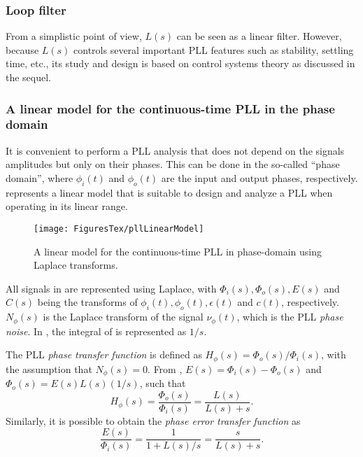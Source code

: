 \subsubsection{Loop filter}

From a simplistic point of view, $L(s)$ can be seen as a linear filter.
However, because $L(s)$ controls
several important PLL features such as stability, settling time, etc., its study and design is based on control systems theory as discussed in the sequel. 

\subsubsection{A linear model for the continuous-time PLL in the phase domain}

It is convenient to perform a PLL analysis that does not depend on the signals amplitudes but only on their phases. This can be done in the so-called ``phase domain'', where $\phi_i(t)$ and $\phi_o(t)$ are
the input and output phases, respectively.
 represents a linear model that is suitable
to design and analyze a PLL when operating in its linear range. 

\begin{figure}[htbp]
\centering
\texttt{[image: FiguresTex/pllLinearModel]}
\caption{A linear model for the continuous-time PLL in phase-domain using Laplace transforms.\label{fig:pllLinearModel}}
\end{figure}

All signals in  are represented using Laplace, with 
$\Phi_i(s), \Phi_o(s), E(s)$ and $C(s)$ being the transforms of 
$\phi_i(t), \phi_o(t), \epsilon(t)$ and $c(t)$, respectively.
$N_{\phi}(s)$ is the Laplace transform of the signal $\nu_{\phi}(t)$, which is the PLL \emph{phase noise}. In , the integral of  is represented as $1/s$.


The PLL \emph{phase transfer function} is defined as
$H_{\phi}(s) = \Phi_o(s)/\Phi_i(s)$, with the assumption that $N_{\phi}(s)=0$. From  , $E(s)=\Phi_i(s)-\Phi_o(s)$ and $\Phi_o(s) = E(s) L(s) (1/s)$, such that 
\begin{equation}
H_{\phi}(s) = \frac{\Phi_o(s)}{\Phi_i(s)} = \frac{L(s)}{L(s)+s}.
\label{eq:pllTransferFunction}
\end{equation}
Similarly, it is possible to obtain the \emph{phase error transfer function} as 
\begin{equation}
\frac{E(s)}{\Phi_i(s)} = \frac{1}{1+L(s)/s} = \frac{s}{L(s)+s}.
\label{eq:pllErrorTrFun}
\end{equation}

